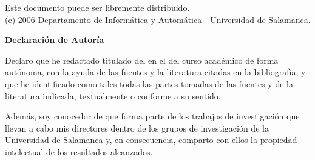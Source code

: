 \documentclass[12pt,a4paper,spanish,twoside]{article}
\begin{document}
\begin{flushleft}
\hspace{1cm}{\footnotesize Autor 4}\\
\hspace{1.5cm}{\footnotesize 1ª Línea Autor4}\\
\hspace{1.5cm}{\footnotesize 2ª Línea Autor4}\\
\hspace{1.5cm}{\footnotesize 3ª Línea Autor4}\\
\hspace{1.5cm}{\footnotesize correo@autor4.com}\\[0.5cm]

\vfill
Este documento puede ser libremente distribuido.\\
(c) 2006 Departamento de Informática y Automática - Universidad de Salamanca.
\end{flushleft}

\newpage
\thispagestyle{empty}

\vspace*{0.5cm}
    \begin{center}
        {\textbf{Declaración de Autoría}}
    \end{center}
\vspace{0.5cm}

\noindent Declaro que he redactado \underline{\hspace{1.5cm}} titulado \underline{\hspace{1.5cm}} del \underline{\hspace{1.5cm}} en el \underline{\hspace{1.5cm}} del curso académico \underline{\hspace{1.5cm}} de forma autónoma, con la ayuda de las fuentes y la literatura citadas en la bibliografía, y que he identificado como tales todas las partes tomadas de las fuentes y de la literatura indicada, textualmente o conforme a su sentido.

\vspace{0.5cm}

\noindent Además, soy conocedor de que \underline{\hspace{1.5cm}} forma parte de los trabajos de investigación que llevan a cabo mis directores \underline{\hspace{1.5cm}} dentro de los grupos de investigación \underline{\hspace{1.5cm}} de la Universidad de Salamanca y, en consecuencia, comparto con ellos la propiedad intelectual de los resultados alcanzados.
\end{document}
